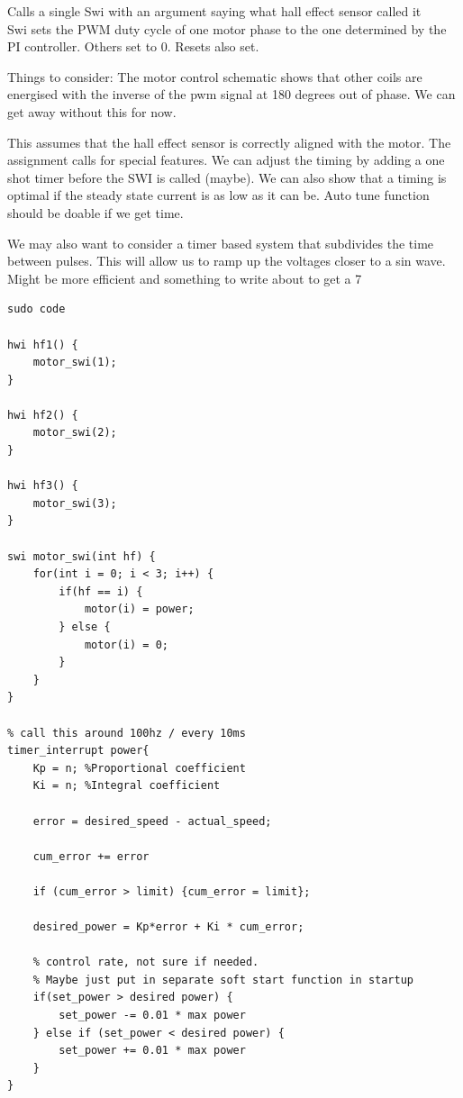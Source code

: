 \documentclass[titlepage]{article}
\begin{document}
Calls a single Swi with an argument saying what hall effect sensor called it\\
Swi sets the PWM duty cycle of one motor phase to the one determined by the PI controller. Others set to 0. Resets also set. 

Things to consider: The motor control schematic shows that other coils are energised with the inverse of the pwm signal at 180 degrees out of phase. We can get away without this for now.

This assumes that the hall effect sensor is correctly aligned with the motor. The assignment calls for special features. We can adjust the timing by adding a one shot timer before the SWI is called (maybe). We can also show that a timing is optimal if the steady state current is as low as it can be. Auto tune function should be doable if we get time. 

We may also want to consider a timer based system that subdivides the time between pulses. This will allow us to ramp up the voltages closer to a sin wave. Might be more efficient and something to write about to get a 7



\clearpage
\begin{lstlisting}
sudo code

hwi hf1() { 
	motor_swi(1);
}

hwi hf2() {
	motor_swi(2);
}

hwi hf3() {
	motor_swi(3);
}

swi motor_swi(int hf) {
	for(int i = 0; i < 3; i++) {
		if(hf == i) {
			motor(i) = power;
		} else {
			motor(i) = 0;
		}
	}
}

% call this around 100hz / every 10ms
timer_interrupt power{
	Kp = n; %Proportional coefficient
	Ki = n; %Integral coefficient

	error = desired_speed - actual_speed;
	
	cum_error += error
	
	if (cum_error > limit) {cum_error = limit};

	desired_power = Kp*error + Ki * cum_error;

	% control rate, not sure if needed. 
	% Maybe just put in separate soft start function in startup
	if(set_power > desired power) {
		set_power -= 0.01 * max power
	} else if (set_power < desired power) {
		set_power += 0.01 * max power
	}
}




\end{lstlisting}
\end{document}
